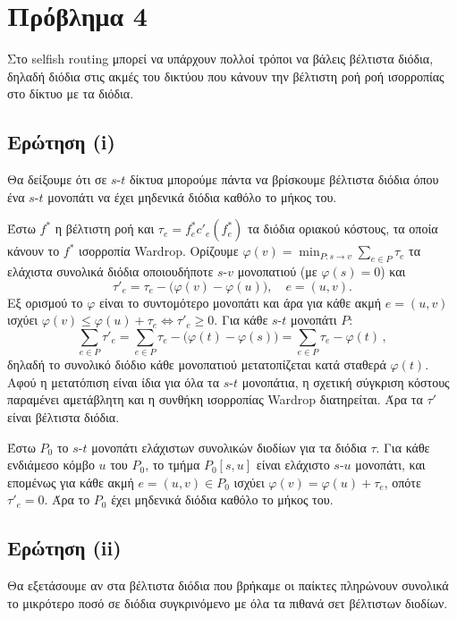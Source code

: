 \section{Πρόβλημα 4}

Στο selfish routing μπορεί να υπάρχουν πολλοί τρόποι να βάλεις βέλτιστα διόδια,
δηλαδή διόδια στις ακμές του δικτύου που κάνουν την βέλτιστη ροή ροή ισορροπίας
στο δίκτυο με τα διόδια.

\subsection{Ερώτηση (i)} \label{sec.q4-i}

Θα δείξουμε ότι σε $s$-$t$ δίκτυα μπορούμε πάντα να βρίσκουμε βέλτιστα διόδια
όπου ένα $s$-$t$ μονοπάτι να έχει μηδενικά διόδια καθόλο το μήκος του.

Έστω $f^*$ η βέλτιστη ροή και $\tau_e = f^*_e c'_e(f^*_e)$ τα διόδια οριακού
κόστους, τα οποία κάνουν το $f^*$ ισορροπία Wardrop. Ορίζουμε
$\varphi(v) = \min_{P \colon s \to v} \sum_{e \in P} \tau_e$ τα ελάχιστα
συνολικά διόδια οποιουδήποτε $s$-$v$ μονοπατιού (με $\varphi(s) = 0$) και
$$
  \tau'_e = \tau_e - \bigl(\varphi(v) - \varphi(u)\bigr), \quad e = (u,v).
$$
Εξ ορισμού το $\varphi$ είναι το συντομότερο μονοπάτι και άρα για κάθε ακμή
$e = (u, v)$ ισχύει $\varphi(v) \leq \varphi(u) + \tau_e
\Leftrightarrow \tau'_e \geq 0$. Για κάθε $s$-$t$ μονοπάτι $P$:
$$
  \sum_{e \in P} \tau'_e = \sum_{e \in P} \tau_e - \bigl(\varphi(t) - \varphi(s)\bigr)
  = \sum_{e \in P} \tau_e - \varphi(t) \,,
$$
δηλαδή το συνολικό διόδιο κάθε μονοπατιού μετατοπίζεται κατά σταθερά $\varphi(t)$.
Αφού η μετατόπιση είναι ίδια για όλα τα $s$-$t$ μονοπάτια, η σχετική σύγκριση
κόστους παραμένει αμετάβλητη και η συνθήκη ισορροπίας Wardrop διατηρείται.
Άρα τα $\tau'$ είναι βέλτιστα διόδια.

Έστω $P_0$ το $s$-$t$ μονοπάτι ελάχιστων συνολικών διοδίων για τα διόδια $\tau$.
Για κάθε ενδιάμεσο κόμβο $u$ του $P_0$, το τμήμα $P_0[s,u]$ είναι ελάχιστο
$s$-$u$ μονοπάτι, και επομένως για κάθε ακμή $e = (u,v) \in P_0$ ισχύει
$\varphi(v) = \varphi(u) + \tau_e$, οπότε $\tau'_e = 0$. Άρα το
$P_0$ έχει μηδενικά διόδια καθόλο το μήκος του.

\subsection{Ερώτηση (ii)}

Θα εξετάσουμε αν στα βέλτιστα διόδια που βρήκαμε οι παίκτες πληρώνουν συνολικά
το μικρότερο ποσό σε διόδια συγκρινόμενο με όλα τα πιθανά σετ βέλτιστων διοδίων.

